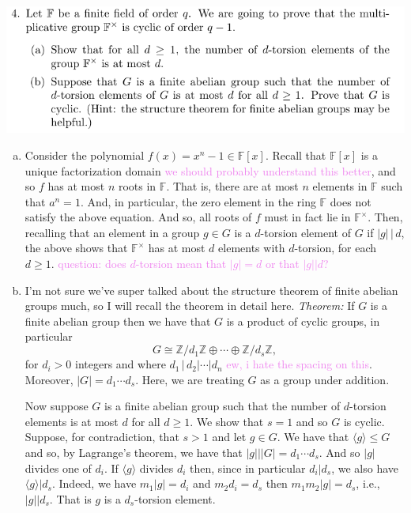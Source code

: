 \documentclass[12pt,letterpaper,boxed]{hmcpset}
\newcommand{\wg}[1]{\textcolor{violet}{#1}}
\newcommand{\Z}{\mathbb Z}
\newcommand{\abs}[1]{\left|#1\right|}
\newcommand{\anglee}[1]{\langle #1 \rangle}
\begin{document}
\begin{problem}
	\includegraphics[scale=0.8]{4.png}
	\hfill
\end{problem}

\begin{solution}

\begin{enumerate}[(a)]
\item Consider the polynomial $f(x) = x^n - 1 \in \mathbb F[x]$. 
Recall that $\mathbb F[x]$ is a unique factorization domain
\wg{we should probably understand this better}, and so $f$ has at most
$n$ roots in $\mathbb F$. That is, there are at most $n$ elements in
$\mathbb F$ such that $a^n = 1$. And, in particular, the zero element
in the ring $\mathbb F$ does not satisfy the above equation. And so,
all roots of $f$ must in fact lie in $\mathbb F^\times$. 
Then, recalling that an element in a group $g \in G$ is a $d$-torsion
element of $G$ if $\abs g \,\vert \, d$, the above shows that $\mathbb
F^\times$ has at most $d$ elements with $d$-torsion, for each $d \geq
1$. 
\wg{question: does $d$-torsion mean that $\abs g = d$ or that $\abs g \vert d$?}


\item I'm not sure we've super talked about the structure theorem of
finite abelian groups much, so I will recall the theorem in detail
here. \textit{Theorem:} If $G$ is a finite abelian group then we have
that $G$ is a product of cyclic groups, in particular
\[
	G \cong \Z / d_1 \Z \oplus \cdots \oplus \Z /d_s \Z,
\]
for $d_i > 0$ integers and where $d_1 \, \vert \, d_2 \vert \cdots \vert
d_n$ \wg{ew, i hate the spacing on this}. Moreover, $\abs G = d_1
\cdots d_s$. Here, we are treating $G$
as a group under addition. 

Now suppose $G$ is a finite abelian group such that the number of
$d$-torsion elements is at most $d$ for all $d \geq 1$. We show that
$s = 1$ and so $G$ is cyclic. Suppose, for contradiction,
that $s > 1$ and let $g \in G$.
We have that $\anglee g \leq G$ and so, by Lagrange's theorem, we have
that $\abs g \vert \abs G = d_1 \cdots d_s$. And so $\abs g$ divides
one of $d_i$. If $\anglee g$ divides $d_i$ then, since in particular
$d_i \vert d_s$, we also have $\anglee g \vert d_s$.
Indeed, we have $m_1 \abs g = d_i$ and $m_2 d_i = d_s$ then $m_1m_2
\abs g = d_s$, i.e., $\abs g \vert d_s$. That is $g$ is a
$d_s$-torsion element.


\end{enumerate}
\end{solution}
\end{document}
